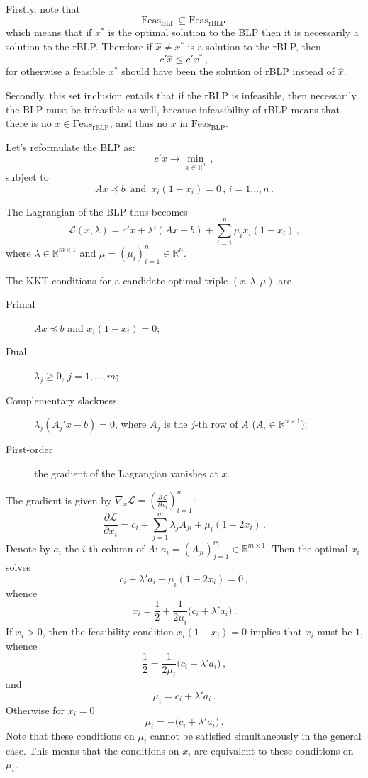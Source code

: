 \documentclass[a4paper]{article}
\newcommand{\Real}{\mathbb{R}}
\newcommand{\Lcal}{\mathcal{L}}
\begin{document}
Firstly, note that 
\[ \text{Feas}_{\text{BLP}} \subseteq \text{Feas}_{\text{rBLP}} \, \]
which means that if $x^*$ is the optimal solution to the BLP then it is necessarily
a solution to the rBLP. Therefore if $\hat{x}\neq x^*$ is a solution to the rBLP, then
\[ c'\hat{x} \leq c'x^* \,, \]
for otherwise a feasible $x^*$ should have been the solution of rBLP instead of $\hat{x}$.

Secondly, this set inclusion entails that if the rBLP is infeasible, then necessarily
the BLP must be infeasible as well, because infeasibility of rBLP means that there is
no $x\in \text{Feas}_{\text{rBLP}}$, and thus no $x$ in $\text{Feas}_{\text{BLP}}$.

Let's reformulate the BLP as:
\[ c'x \to \min_{x\in \Real^n}\,, \]
subject to 
\[ Ax \preceq b\,\text{ and }\, x_i(1-x_i) = 0\,,\, i=1\ldots, n \,. \]

The Lagrangian of the BLP thus becomes
\[
\Lcal( x, \lambda )
= c'x + \lambda' (A x - b) + \sum_{i=1}^n \mu_i x_i (1-x_i) \,,
\]
where $\lambda \in \Real^{m\times 1}$ and $\mu=(\mu_i)_{i=1}^n \in \Real^n$.

The KKT conditions for a candidate optimal triple $(x,\lambda,\mu)$ are
\begin{description}
	\item[Primal] $Ax \preceq b$ and $x_i(1-x_i) = 0$;
	\item[Dual] $\lambda_j\geq 0$, $j=1,\ldots, m$;
	\item[Complementary slackness] $\lambda_j (A_j' x - b)=0$, where $A_j$ is the $j$-th 
	row of $A$ ($A_i\in \Real^{n\times 1}$);
	\item[First-order] the gradient of the Lagrangian vanishes at $x$.
\end{description}
The gradient is given by $\nabla_x \Lcal = ( \tfrac{\partial\Lcal}{\partial x_i} )_{i=1}^n$:
\[
\frac{\partial\Lcal}{\partial x_i}
	= c_i + \sum_{j=1}^m \lambda_j A_{ji} + \mu_i ( 1 - 2 x_i ) \,.
\]
Denote by $a_i$ the $i$-th column of $A$: $a_i = (A_{ji})_{j=1}^m \in \Real^{m\times 1}$. 
Then the optimal $x_i$ solves
\[ c_i + \lambda' a_i + \mu_i ( 1-2 x_i)  = 0 \,, \]
whence
\[ x_i = \frac{1}{2} + \frac{1}{2\mu_i}\bigl( c_i + \lambda' a_i \bigr) \,. \]
If $x_i>0$, then the feasibility condition $x_i(1-x_i) = 0$ implies that $x_i$ must
be $1$, whence
\[ \frac{1}{2} = \frac{1}{2\mu_i}\bigl( c_i + \lambda' a_i \bigr)\,, \]
and
\[ \mu_i = c_i + \lambda' a_i \,. \]
Otherwise for $x_i=0$
\[ \mu_i = -\bigl( c_i + \lambda' a_i\bigr) \,. \]
Note that these conditions on $\mu_i$ cannot be satisfied simultaneously in the general
case. This means that the conditions on $x_i$ are equivalent to these conditions
on $\mu_i$.
\end{document}
